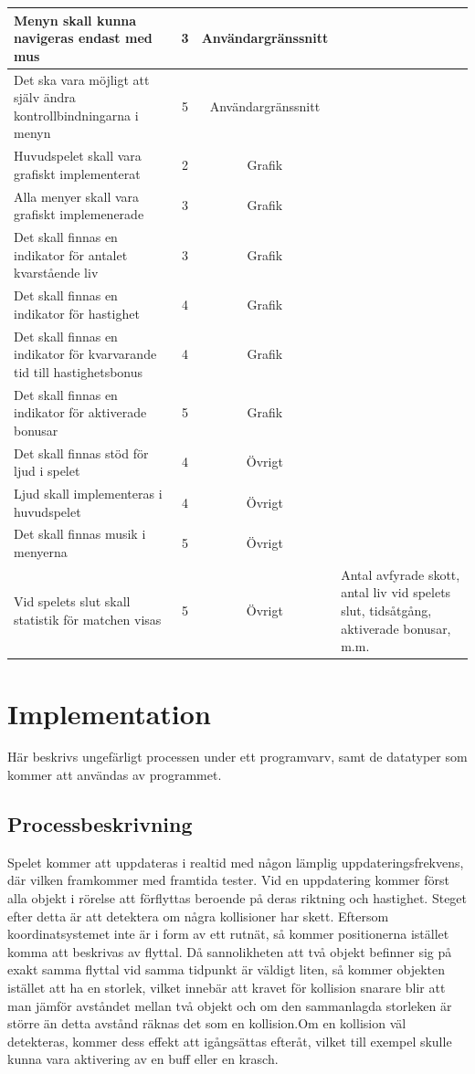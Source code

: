 \documentclass[12pt,a4paper]{article}
\begin{document}
\begin{longtable}{ | p{3.5cm} | c | c | p{3.5cm} | }
	Menyn skall kunna navigeras endast med mus & 3 & Användargränssnitt & \\ \hline
	Det ska vara möjligt att själv ändra kontrollbindningarna i menyn & 5 & Användargränssnitt & \\ \hline
	Huvudspelet skall vara grafiskt implementerat & 2 & Grafik & \\ \hline
	Alla menyer skall vara grafiskt implemenerade & 3 & Grafik & \\ \hline
	Det skall finnas en indikator för antalet kvarstående liv & 3 & Grafik & \\ \hline
	Det skall finnas en indikator för hastighet & 4 & Grafik & \\ \hline
	Det skall finnas en indikator för kvarvarande tid till hastighetsbonus & 4 & Grafik & \\ \hline
	Det skall finnas en indikator för aktiverade bonusar & 5 & Grafik & \\ \hline
	Det skall finnas stöd för ljud i spelet & 4 & Övrigt & \\ \hline
	Ljud skall implementeras i huvudspelet & 4 & Övrigt & \\ \hline
	Det skall finnas musik i menyerna & 5 & Övrigt & \\ \hline
	Vid spelets slut skall statistik för matchen visas & 5 & Övrigt & Antal avfyrade skott, antal liv vid spelets slut, tidsåtgång, aktiverade bonusar, m.m.\\ \hline
\end{longtable}

\section{Implementation}
Här beskrivs ungefärligt processen under ett programvarv, samt de datatyper som kommer att användas av programmet. 

\subsection{Processbeskrivning}
Spelet kommer att uppdateras i realtid med någon lämplig uppdateringsfrekvens, där vilken framkommer med framtida tester. Vid en uppdatering kommer först alla objekt i rörelse att förflyttas beroende på deras riktning och hastighet. Steget efter detta är att detektera om några kollisioner har skett. Eftersom koordinatsystemet inte är i form av ett rutnät, så kommer positionerna istället komma att beskrivas av flyttal. Då sannolikheten att två objekt befinner sig på exakt samma flyttal vid samma tidpunkt är väldigt liten, så kommer objekten istället att ha en storlek, vilket innebär att kravet för kollision snarare blir att man jämför avståndet mellan två objekt och om den sammanlagda storleken är större än detta avstånd räknas det som en kollision.Om en kollision väl detekteras, kommer dess effekt att igångsättas efteråt, vilket till exempel skulle kunna vara aktivering av en buff eller en krasch. \\
\end{document}
